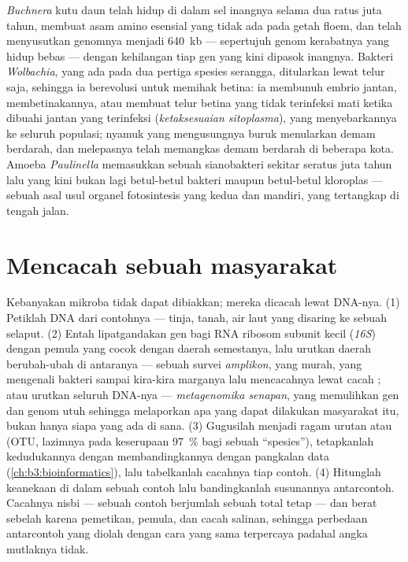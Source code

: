 \begin{example}\label{ex:b3:microbiomes:obligate}
\emph{Buchnera} kutu daun telah hidup di dalam sel inangnya selama dua ratus
juta tahun, membuat asam amino esensial yang tidak ada pada getah floem, dan
telah menyusutkan genomnya menjadi \qty{640}{kb} --- sepertujuh genom kerabatnya
yang hidup bebas --- dengan kehilangan tiap gen yang kini dipasok inangnya.
Bakteri \emph{Wolbachia}, yang ada pada dua pertiga spesies serangga,
ditularkan lewat telur saja, sehingga ia berevolusi untuk memihak betina: ia
membunuh embrio jantan, membetinakannya, atau membuat telur betina yang tidak
terinfeksi mati ketika dibuahi jantan yang terinfeksi (\emph{ketaksesuaian
sitoplasma}), yang menyebarkannya ke seluruh populasi; nyamuk yang
mengusungnya buruk menularkan demam berdarah, dan melepasnya telah memangkas
demam berdarah di beberapa kota. Amoeba \emph{Paulinella} memasukkan sebuah
sianobakteri sekitar seratus juta tahun lalu yang kini bukan lagi betul-betul
bakteri maupun betul-betul kloroplas --- sebuah asal usul organel fotosintesis
yang kedua dan mandiri, yang tertangkap di tengah jalan.
\end{example}

\section{Mencacah sebuah masyarakat}

\begin{method}\label{met:b3:microbiomes:16s}
%
Kebanyakan mikroba tidak dapat dibiakkan; mereka dicacah lewat DNA-nya. (1)
Petiklah DNA dari contohnya --- tinja, tanah, air laut yang disaring ke sebuah
selaput. (2) Entah lipatgandakan gen bagi RNA ribosom subunit kecil
(\emph{16S}) dengan pemula yang cocok dengan daerah semestanya, lalu urutkan
daerah berubah-ubah di antaranya --- sebuah survei \emph{amplikon}, yang murah,
yang mengenali bakteri sampai kira-kira marganya lalu mencacahnya lewat cacah
; atau urutkan seluruh DNA-nya --- \emph{metagenomika senapan}, yang
memulihkan gen dan genom utuh sehingga melaporkan apa yang dapat dilakukan
masyarakat itu, bukan hanya siapa yang ada di sana. (3) Gugusilah 
menjadi ragam urutan atau \emph{} (OTU, lazimnya
pada keserupaan \qty{97}{\%} bagi sebuah ``spesies''), tetapkanlah
kedudukannya dengan membandingkannya dengan pangkalan data
(\cref{ch:b3:bioinformatics}), lalu tabelkanlah cacahnya tiap contoh. (4)
Hitunglah keanekaan di dalam sebuah contoh lalu bandingkanlah susunannya
antarcontoh. Cacahnya nisbi ---  sebuah contoh berjumlah sebuah total
tetap --- dan berat sebelah karena pemetikan, pemula, dan cacah salinan,
sehingga perbedaan antarcontoh yang diolah dengan cara yang sama terpercaya
padahal angka mutlaknya tidak.
\end{method}

